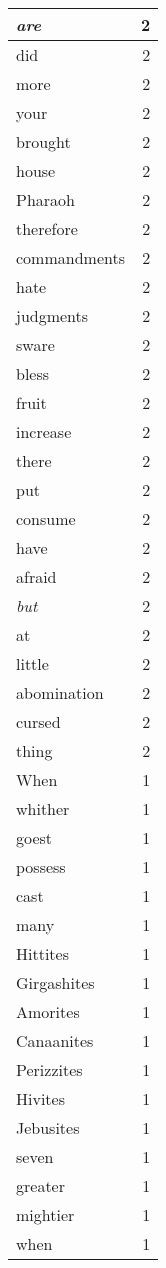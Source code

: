 \begin{center}
\begin{longtable}{l|r}
\emph{are} & 2 \\ \hline
did & 2 \\ \hline
more & 2 \\ \hline
your & 2 \\ \hline
brought & 2 \\ \hline
house & 2 \\ \hline
Pharaoh & 2 \\ \hline
therefore & 2 \\ \hline
commandments & 2 \\ \hline
hate & 2 \\ \hline
judgments & 2 \\ \hline
sware & 2 \\ \hline
bless & 2 \\ \hline
fruit & 2 \\ \hline
increase & 2 \\ \hline
there & 2 \\ \hline
put & 2 \\ \hline
consume & 2 \\ \hline
have & 2 \\ \hline
afraid & 2 \\ \hline
\emph{but} & 2 \\ \hline
at & 2 \\ \hline
little & 2 \\ \hline
abomination & 2 \\ \hline
cursed & 2 \\ \hline
thing & 2 \\ \hline
When & 1 \\ \hline
whither & 1 \\ \hline
goest & 1 \\ \hline
possess & 1 \\ \hline
cast & 1 \\ \hline
many & 1 \\ \hline
Hittites & 1 \\ \hline
Girgashites & 1 \\ \hline
Amorites & 1 \\ \hline
Canaanites & 1 \\ \hline
Perizzites & 1 \\ \hline
Hivites & 1 \\ \hline
Jebusites & 1 \\ \hline
seven & 1 \\ \hline
greater & 1 \\ \hline
mightier & 1 \\ \hline
when & 1 \\ \hline

\end{longtable}
\end{center}
